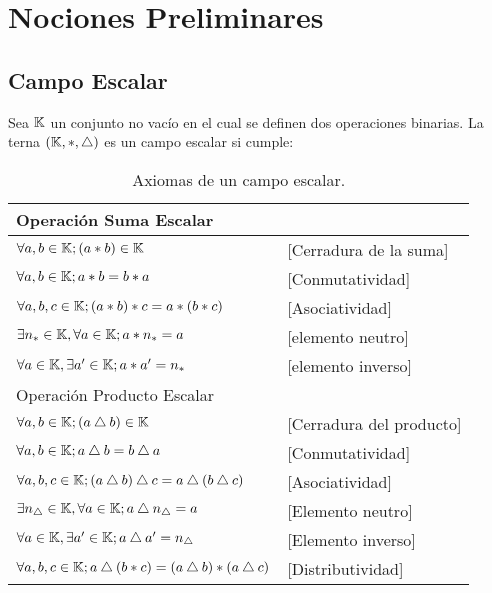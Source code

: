 \chapter{Nociones Preliminares}

\section{Campo Escalar}
Sea $\mathbb{K}$ un conjunto no vacío en el cual se definen dos operaciones binarias. La terna $\left( \mathbb{K},\ast,\bigtriangleup \right)$ es un campo escalar si cumple: 



\begin{table}[htbp]
\begin{center}
\begin{tabular}{|l|l|}
\hline
\multicolumn{2}{|l|}{Operación Suma Escalar } \\
\hline \hline
$\forall a,b\in \mathbb{K}; (a*b)\in \mathbb{K} $ &[Cerradura de la suma] \\ \hline
$ \forall  a,b\in \mathbb{K}; a*b=b*a $&[Conmutatividad]  \\ \hline
$\forall  a,b,c\in \mathbb{K}; (a*b)*c=a*(b*c)$&[Asociatividad] \\ 
\hline
$\exists n_* \in \mathbb{K}, \forall  a\in \mathbb{K}; a*n_*=a$&  [elemento neutro]  \\ \hline
$\forall  a\in \mathbb{K}, \exists a'\in \mathbb{K}; a*a'=n_*$&  [elemento inverso]  \\ \hline\hline 
\multicolumn{2}{|l|}{Operación Producto Escalar} \\ \hline \hline
 $\forall  a,b\in \mathbb{K}; (a\bigtriangleup b)\in \mathbb{K} $& [Cerradura del producto] \\ \hline
$\forall  a,b\in \mathbb{K}; a\bigtriangleup b=b\bigtriangleup a$&  [Conmutatividad]  \\ \hline
$\forall  a,b,c\in \mathbb{K}; (a\bigtriangleup b)\bigtriangleup c=a\bigtriangleup (b\bigtriangleup c) $&  [Asociatividad]  \\ \hline
$\exists n_\bigtriangleup \in \mathbb{K}, \forall  a\in \mathbb{K};  a \bigtriangleup n_\bigtriangleup =a $&  [Elemento neutro]  \\ \hline
$\forall  a\in \mathbb{K}, \exists a' \in \mathbb{K}; a \bigtriangleup a'=n_\bigtriangleup  $&  [Elemento inverso]  \\ \hline \hline
$\forall a,b,c\in \mathbb{K};  a\bigtriangleup (b*c)=(a\bigtriangleup b)*(a\bigtriangleup c)$ & [Distributividad]\\ \hline
\end{tabular}
\caption{Axiomas de un campo escalar.}
\label{tabla:sencilla}
\end{center}
\end{table}


